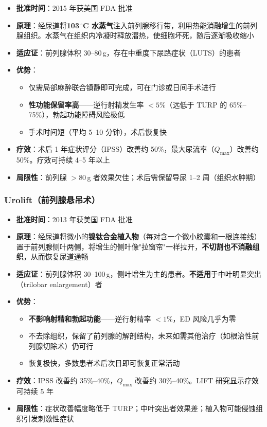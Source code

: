 \begin{itemize}[leftmargin=2cm]
	\item \textbf{批准时间}：2015 年获美国 FDA 批准
	\item \textbf{原理}：经尿道将\textbf{103\,$^\circ$C 水蒸气}注入前列腺移行带，利用热能消融增生的前列腺组织。水蒸气在组织内冷凝时释放潜热，使细胞坏死，随后逐渐吸收缩小
	\item \textbf{适应证}：前列腺体积 30--80\,g，存在中重度下尿路症状（LUTS）的患者
	\item \textbf{优势}：
	\begin{itemize}
		\item 仅需局部麻醉联合镇静即可完成，可在门诊或日间手术进行
		\item \textbf{性功能保留率高}——逆行射精发生率 $<5\%$（远低于 TURP 的 65\%--75\%），勃起功能障碍风险极低
		\item 手术时间短（平均 5--10 分钟），术后恢复快
	\end{itemize}
	\item \textbf{疗效}：术后 1 年症状评分（IPSS）改善约 50\%，最大尿流率（$Q_{\max}$）改善约 50\%。疗效可持续 4--5 年以上
	\item \textbf{局限性}：前列腺 $>80$\,g 者效果欠佳；术后需保留导尿 1--2 周（组织水肿期）
\end{itemize}

\subsubsection{Urolift（前列腺悬吊术）}

\begin{itemize}[leftmargin=2cm]
	\item \textbf{批准时间}：2013 年获美国 FDA 批准
	\item \textbf{原理}：经尿道将微小的\textbf{镍钛合金植入物}（每对含一个微小胶囊和一根连接线）置于前列腺侧叶两侧，将增生的侧叶像"拉窗帘"一样拉开，\textbf{不切割也不消融组织}，从而恢复尿道通畅
	\item \textbf{适应证}：前列腺体积 30--100\,g，侧叶增生为主的患者。\textbf{不适用}于中叶明显突出（trilobar enlargement）者
	\item \textbf{优势}：
	\begin{itemize}
		\item \textbf{不影响射精和勃起功能}——逆行射精率 $<1\%$，ED 风险几乎为零
		\item 不去除组织，保留了前列腺的解剖结构，未来如需其他治疗（如根治性前列腺切除术）仍可行
		\item 恢复极快，多数患者术后次日即可恢复正常活动
	\end{itemize}
	\item \textbf{疗效}：IPSS 改善约 35\%--40\%，$Q_{\max}$ 改善约 30\%--40\%。LIFT 研究显示疗效可持续 5 年
	\item \textbf{局限性}：症状改善幅度略低于 TURP；中叶突出者效果差；植入物可能侵蚀组织引发刺激性症状
\end{itemize}

